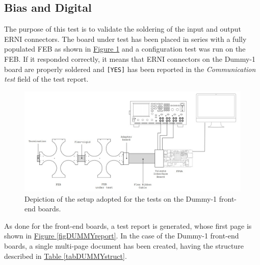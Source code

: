 
\subsection{Bias and Digital}
The purpose of this test is to validate the soldering of the input and output ERNI connectors. The board under test has been placed in series with a fully populated FEB as shown in \hyperref[figDUMMYtest]{Figure \ref{figDUMMYtest}} and a configuration test was run on the FEB. If it responded correctly, it means that ERNI connectors on the Dummy-1 board are properly soldered and \texttt{[YES]} has been reported in the \textit{Communication test} field of the test report.

\begin{figure}[h!]
    \centering
    \includegraphics[width=1\textwidth]{Images/chap2/test_setup_FEB_2.jpg}
    \caption{Depiction of the setup adopted for the tests on the Dummy-1 front-end boards.}
    \label{figDUMMYtest}
\end{figure}

\par
As done for the front-end boards, a test report is generated, whose first page is shown in \hyperref[figDUMMYreport]{Figure \ref{figDUMMYreport}}. In the case of the Dummy-1 front-end boards, a single multi-page document has been created, having the structure described in \hyperref[tabDUMMYstruct]{Table \ref{tabDUMMYstruct}}.

